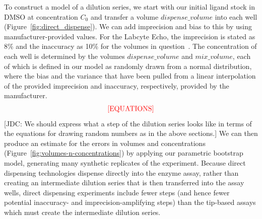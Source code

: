 \documentclass[aps,pre,twocolumn,nofootinbib,superscriptaddress,linenumbers]{revtex4-1}
\begin{document}
To construct a model of a dilution series, we start with our initial ligand stock in DMSO at concentration $C_0$ and transfer a volume $dispense\_volume$ into each well (Figure~\ref{fig:direct_dispense}). 
We can add imprecision and bias to this by using manufacturer-provided values.
For the Labcyte Echo, the imprecision is stated as 8\% and the inaccuracy as 10\% for the volumes in question~\cite{_echo_2011}. 
The concentration of each well is determined by the volumes $dispense\_volume$ and $mix\_volume$, each of which is defined in our model as randomly drawn from a normal distribution, where the bias and the variance that have been pulled from a linear interpolation of the provided imprecision and inaccuracy, respectively, provided by the manufacturer.
\begin{eqnarray}
\color{red}
\mathrm{[EQUATIONS]}
\end{eqnarray}
{\color{red}[JDC: We should express what a step of the dilution series looks like in terms of the equations for drawing random numbers as in the above sections.]}
We can then produce an estimate for the errors in volumes and concentrations (Figure~\ref{fig:volumes-n-concentrations}) by applying our parametric bootstrap model, generating many synthetic replicates of the experiment.
Because direct dispensing technologies dispense directly into the enzyme assay, rather than creating an intermediate dilution series that is then transferred into the assay wells, direct dispensing experiments include fewer steps (and hence fewer potential inaccuracy- and imprecision-amplifying steps) than the tip-based assays which must create the intermediate dilution series.
\end{document}
